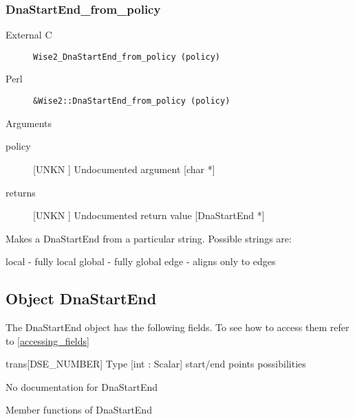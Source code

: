\subsubsection{DnaStartEnd_from_policy}
\begin{description}
\item[External C] {\tt Wise2_DnaStartEnd_from_policy (policy)}
\item[Perl] {\tt &Wise2::DnaStartEnd_from_policy (policy)}

\end{description}
Arguments
\begin{description}
\item[policy] [UNKN ] Undocumented argument [char *]
\item[returns] [UNKN ] Undocumented return value [DnaStartEnd *]
\end{description}
Makes a DnaStartEnd from a particular string.
Possible strings are:


local - fully local
global - fully global
edge - aligns only to edges




\subsection{Object DnaStartEnd}

\label{object_DnaStartEnd}

The DnaStartEnd object has the following fields. To see how to access them refer to \ref{accessing_fields}
\begin{description}
\item{trans[DSE_NUMBER]} Type [int : Scalar]  start/end points possibilities

\end{description}
No documentation for DnaStartEnd

Member functions of DnaStartEnd

